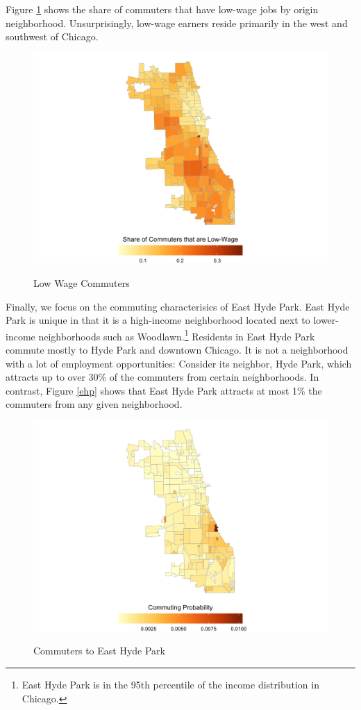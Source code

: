 \documentclass[12pt]{article}
\begin{document}
Figure \ref{fig:lowwage_commute} shows the share of commuters that have low-wage jobs by origin neighborhood. Unsurprisingly, low-wage earners reside primarily in the west and southwest of Chicago. 
\begin{figure}[h!]
    \centering
    \caption{Low Wage Commuters}
    \includegraphics[width=\linewidth]{Pset1/code/lodes_diagnostics_files/figure-html/fig-sharelowtypebyhome-1.png}
    \label{fig:lowwage_commute}
\end{figure}
Finally, we focus on the commuting characterisics of East Hyde Park. East Hyde Park is unique in that it is a high-income neighborhood located next to lower-income neighborhoods such as Woodlawn.\footnote{East Hyde Park is in the 95th percentile of the income distribution in Chicago.} Residents in East Hyde Park commute mostly to Hyde Park and downtown Chicago. It is not a neighborhood with a lot of employment opportunities: Consider its neighbor, Hyde Park, which attracts up to over 30\% of the commuters from certain neighborhoods. In contrast, Figure \ref{ehp} shows that East Hyde Park attracts at most 1\% the commuters from any given neighborhood. 
\begin{figure}[h!]
    \centering
    \caption{Commuters to East Hyde Park}
    \includegraphics[width=\linewidth]{Pset1/code/lodes_diagnostics_files/figure-html/unnamed-chunk-12-1.png}
    \label{fig:ehp}
\end{figure}
\end{document}
